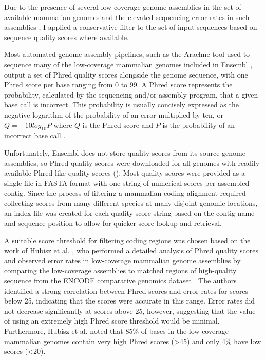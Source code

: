 Due to the presence of several low-coverage genome assemblies in the
set of available mammalian genomes and the elevated sequencing error
rates in such assemblies \citep{TODO, Ensembl 2x paper}, I applied a
conservative filter to the set of input sequences based on sequence
quality scores where available.

Most automated genome assembly pipelines, such as the Arachne tool
used to sequence many of the low-coverage mammalian genomes included
in Ensembl \citep{TODO, Arachne}, output a set of Phred quality scores
alongside the genome sequence, with one Phred score per base ranging
from 0 to 99. A Phred score represents the probability, calculated by
the sequencing and/or assembly program, that a given base call is
incorrect. This probability is usually concisely expressed as the
negative logarithm of the probability of an error multiplied by ten,
or $Q = -10log_{10}P$ where $Q$ is the Phred score and $P$ is the
probability of an incorrect base call \citep{TODO, Cock et al. 2010
  NAR}.

Unfortunately, Ensembl does not store quality scores from its source
genome assemblies, so Phred quality scores were downloaded for all
genomes with readily available Phred-like quality scores (). Most quality
scores were provided as a single file in FASTA format with one string
of numerical scores per assembled contig. Since the process of
filtering a mammalian coding alignment required collecting scores from
many different species at many disjoint genomic locations, an index
file was created for each quality score string based on the contig
name and sequence position to allow for quicker score lookup and
retrieval.

A suitable score threshold for filtering coding regions was chosen
based on the work of Hubisz et al. \citeyearpar{TODO}, who performed a
detailed analysis of Phred quality scores and observed error rates in
low-coverage mammalian genome assemblies by comparing the low-coverage
assemblies to matched regions of high-quality sequence from the ENCODE
comparative genomics dataset \citep{TODO}. The authors identified a
strong correlation between Phred scores and error rates for scores
below 25, indicating that the scores were accurate in this
range. Error rates did not decrease significantly at scores above 25,
however, suggesting that the value of using an extremely high Phred
score threshold would be minimal. Furthermore, Hubisz et al. noted
that 85\% of bases in the low-coverage mammalian genomes contain very
high Phred scores (>45) and only 4\% have low scores (<20).

